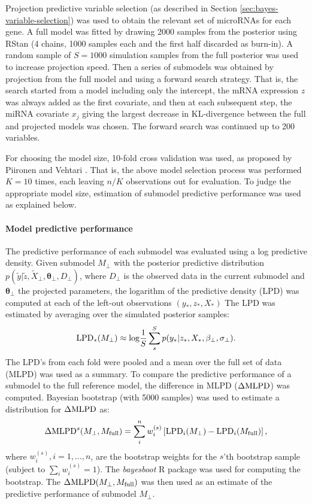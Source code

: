 Projection predictive variable selection (as described in Section
\ref{sec:bayes-variable-selection}) was used to obtain the relevant set
of microRNAs for each gene. A full model was fitted by drawing 2000 samples
from the posterior using RStan (4 chains, 1000 samples each and the first half
discarded as burn-in). A random sample of $S=1000$ simulation samples from the
full posterior was used to increase projection speed. Then a series of
submodels was obtained by projection from the full model and using a forward
search strategy. That is, the search started from a model including only the
intercept, the mRNA expression $z$ was always added as the first covariate,
and then at each subsequent step, the miRNA covariate $x_j$ giving the largest
decrease in KL-divergence between the full and projected models was chosen.
The forward search was continued up to 200 variables.

For choosing the model size, 10-fold cross validation was used, as proposed by
Piironen and Vehtari \citep{Piironen2016}. That is, the above model selection
process was performed $K=10$ times, each leaving $n/K$ observations out for
evaluation. To judge the appropriate model size, estimation of submodel
predictive performance was used as explained below.

\paragraph{Model predictive performance}
The predictive performance of each submodel was evaluated using 
a log predictive density.
Given submodel $M_\perp$ with the posterior predictive distribution
$p(\tilde{y}| \tilde{z}, \tilde{X}_\perp, \mathbf{\theta}_\perp, D_\perp)$,
where $D_\perp$ is the observed data in the current submodel and
$\mathbf{\theta}_\perp$ the projected parameters, the logarithm of the predictive density
(LPD) was computed at each of the left-out observations $(y_*, z_*, X_*)$ The LPD was
estimated by averaging over the simulated posterior samples:
\[
	\textup{LPD}_*(M_\perp) \approx \textup{log}\frac{1}{S} \sum_s^S p(y_*| z_*, X_*, \mathbf{\beta}_\perp, \sigma_\perp).
\]
The LPD's from each fold were pooled and a mean over the full set of data
(MLPD) was used as a summary. To compare the predictive performance of a
submodel to the full reference model, the difference in MLPD ($\Delta \textup{MLPD}$) was
computed. Bayesian bootstrap (with 5000 samples) was used to estimate a
distribution for $\Delta \textup{MLPD}$ as:
\[
	\Delta \textup{MLPD}^{s}(M_\perp,M_{\textup{full}}) = \sum_i^n w_i^{(s)} \left [ \textup{LPD}_i(M_\perp) - \textup{LPD}_i(M_{\textup{full}}) \right ],
\]
where $w_i^{(s)}, i = 1, \dotsc,n$, are the bootstrap weights
for the $s$'th bootstrap sample (subject to $\sum_i w_i^{(s)} = 1$).
The \emph{bayesboot} R package was used for computing the bootstrap.
The $\Delta \textup{MLPD}(M_\perp,M_{\textup{full}})$ was then used
as an estimate of the predictive performance of submodel $M_\perp$.

